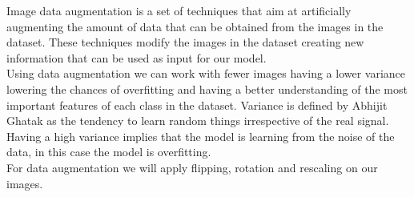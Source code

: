 Image data augmentation is a set of techniques that aim at artificially augmenting the amount of data that can be obtained from the images in the dataset.  These techniques modify the images in the dataset creating new information that can be used as input for our model. \\

Using data augmentation we can work with fewer images having a lower variance lowering the chances of overfitting and having a better understanding of the most important features of each class in the dataset. Variance is defined by Abhijit Ghatak \cite{data_augmentation} as the tendency to learn random things irrespective of the real signal. Having a high variance implies that the model is learning from the noise of the data, in this case the model is overfitting. \\

For data augmentation we will apply flipping, rotation and rescaling on our images.